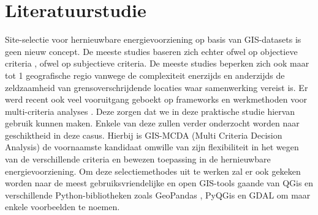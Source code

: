 \section{Literatuurstudie}%
\label{sec:literatuurstudie}

Site-selectie voor hernieuwbare energievoorziening op basis van GIS-\-datasets is geen nieuw concept. De meeste studies baseren zich echter ofwel op objectieve criteria \autocite{Nassar2025}, ofwel op subjectieve criteria. De meeste studies beperken zich ook maar tot 1 geografische regio vanwege de complexiteit enerzijds en anderzijds de zeldzaamheid van grensoverschrijdende locaties waar samenwerking vereist is. Er werd recent ook veel vooruitgang geboekt op frameworks en werkmethoden voor multi-\-criteria analyses \autocite{Seran2025}. Deze zorgen dat we in deze praktische studie hiervan gebruik kunnen maken. Enkele van deze zullen verder onderzocht worden naar geschiktheid in deze casus. Hierbij is GIS-\-MCDA (Multi Criteria Decision Analysis) \autocite{Malczewski2015} de voornaamste kandidaat omwille van zijn flexibiliteit in het wegen van de verschillende criteria en bewezen toepassing in de hernieuwbare energievoorziening. Om deze selectiemethodes uit te werken zal er ook gekeken worden naar de meest gebruiksvriendelijke en open GIS-\-tools gaande van QGis \autocite{QGis2025} en verschillende Python-\-bibliotheken zoals GeoPandas \autocite{GeoPandas2025}, PyQGis \autocite{PyQGis2025} en GDAL \autocite{Rouault2025} om maar enkele voorbeelden te noemen.





